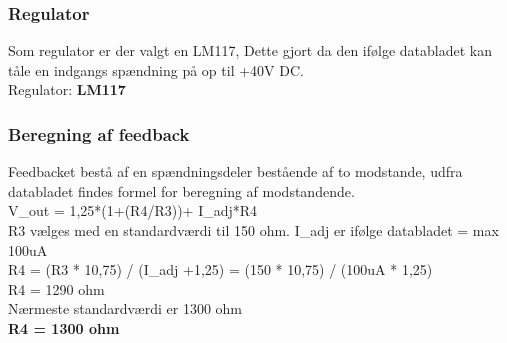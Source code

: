 \subsubsection{Regulator}
Som regulator er der valgt en LM117, Dette gjort da den ifølge databladet kan tåle en indgangs spændning på op til +40V DC. \\
Regulator: \textbf{LM117}
\subsubsection{Beregning af feedback}
Feedbacket bestå af en spændningsdeler bestående af to modstande, udfra databladet findes formel for beregning af modstandende. \\
V\_out = 1,25*(1+(R4/R3))+ I\_adj*R4 \\
R3 vælges med en standardværdi til 150 ohm. I\_adj er ifølge databladet = max 100uA \\
R4 = (R3 * 10,75) / (I\_adj +1,25) = (150 * 10,75) / (100uA * 1,25) \\
R4 = 1290 ohm \\
Nærmeste standardværdi er 1300 ohm \\
\textbf{R4 = 1300 ohm}

\newpage
